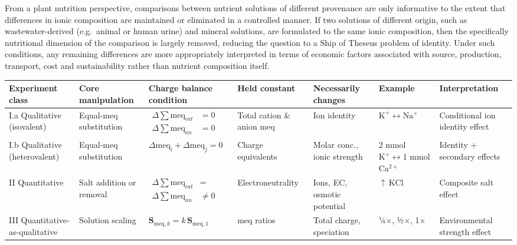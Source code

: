 \documentclass[
  letterpaper,
  DIV=11,
  numbers=noendperiod]{scrreprt}
\begin{document}
From a plant nutrition perspective, comparisons between nutrient
solutions of different provenance are only informative to the extent
that differences in ionic composition are maintained or eliminated in a
controlled manner. If two solutions of different origin, such as
wastewater-derived (e.g.~animal or human urine) and mineral solutions,
are formulated to the same ionic composition, then the specifically
nutritional dimension of the comparison is largely removed, reducing the
question to a Ship of Theseus problem of identity. Under such
conditions, any remaining differences are more appropriately interpreted
in terms of economic factors associated with source, production,
transport, cost and sustainability rather than nutrient composition
itself.

\begin{landscape}
\begingroup
\fontsize{11}{13}\selectfont
\setlength{\tabcolsep}{4pt}
\renewcommand{\arraystretch}{1.1}

\begin{tabular}{
>{\raggedright\arraybackslash}p{2.8cm}
>{\raggedright\arraybackslash}p{3.2cm}
>{\raggedright\arraybackslash}p{4.2cm}
>{\raggedright\arraybackslash}p{3.2cm}
>{\raggedright\arraybackslash}p{4.0cm}
>{\raggedright\arraybackslash}p{2.7cm}
>{\raggedright\arraybackslash}p{3.2cm}
}
\toprule
Experiment class & Core manipulation & Charge balance condition & Held constant & Necessarily changes & Example & Interpretation \\
\midrule
I.a Qualitative (isovalent) &
Equal-meq substitution &
$\begin{aligned}
\Delta \sum \mathrm{meq}_{cat} &= 0 \\
\Delta \sum \mathrm{meq}_{an}  &= 0
\end{aligned}$ &
Total cation \& anion meq &
Ion identity &
$\mathrm{K^+}\!\leftrightarrow\!\mathrm{Na^+}$ &
Conditional ion identity effect \\
\addlinespace[3pt]
I.b Qualitative (heterovalent) &
Equal-meq substitution &
$\Delta \mathrm{meq}_i+\Delta \mathrm{meq}_j=0$ &
Charge equivalents &
Molar conc., ionic strength &
$2$ mmol $\mathrm{K^+}\!\leftrightarrow\!1$ mmol $\mathrm{Ca^{2+}}$ &
Identity + secondary effects \\
\addlinespace[3pt]
II Quantitative &
Salt addition or removal &
$\begin{aligned}
\Delta \sum \mathrm{meq}_{cat} &= \\ \Delta \sum \mathrm{meq}_{an} 
&\neq 0
\end{aligned}$ &
Electroneutrality &
Ions, EC, osmotic potential &
$\uparrow\,\mathrm{KCl}$ &
Composite salt effect \\
\addlinespace[3pt]
III Quantitative-as-qualitative &
Solution scaling &
$\mathbf{S}_{\mathrm{meq},k}=k\,\mathbf{S}_{\mathrm{meq},1}$ &
meq ratios &
Total charge, speciation &
¼×, ½×, 1× &
Environmental strength effect \\
\bottomrule
\end{tabular}

\endgroup
\end{landscape}
\end{document}
